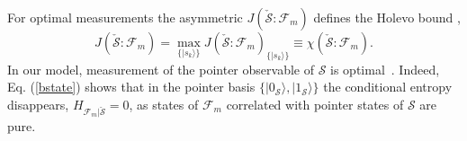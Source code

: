 \documentclass[aps,prl,showpacs,amsmath,amssymb,amsfonts,lengthcheck,twocolumn,longbibliography,superscriptaddress]{revtex4-2}
\newcommand\myeqref[1]{
	Eq. (\textup{\ref{#1}})
}
\newcommand{\ket}[1]    {| #1 \rangle}
\newcommand{\cS}        {{\mathcal S}}
\newcommand{\+}         {\dagger}
\newcommand\cF{{\mathcal F}}
\newcommand{\mc}[1]{\mathcal{#1}}
\begin{document}
For  optimal  measurements the asymmetric $J(\check \cS : \mc{F}_m)$ defines the Holevo bound \cite{Holevo},
\begin{equation}
\label{eq:holevo}
J(\check \cS:\mc{F}_m)=\max_{\{ \ket {s_k} \}} J(\check \cS:\mc{F}_m)_{\{ \ket {s_k} \}} \equiv \chi (\check \cS:\mc{F}_m) .
\end{equation}
In our model,
measurement of the pointer observable of $\cS$ is optimal~\cite{ZQZ10}. Indeed,~\myeqref{bstate} shows that in the pointer basis $\{\ket {0_\cS}, \ket {1_\cS}\}$ the conditional entropy disappears, $H_{{\cF_m} | {\check \cS}} = 0$, as states of $\cF_m$ correlated with pointer states of $\cS$ are pure.
\end{document}
